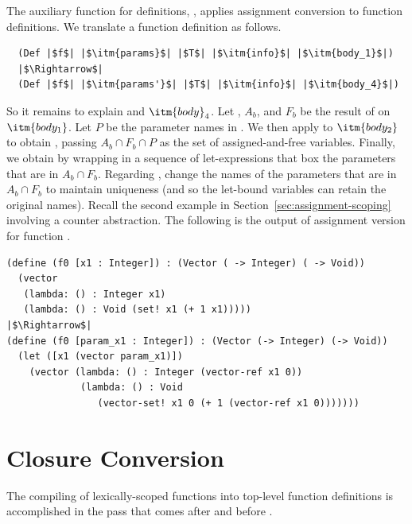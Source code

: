 \documentclass[7x10]{TimesAPriori_MIT}%
\begin{document}
The auxiliary function for definitions, ,
applies assignment conversion to function definitions.
We translate a function definition as follows.
\begin{lstlisting}
  (Def |$f$| |$\itm{params}$| |$T$| |$\itm{info}$| |$\itm{body_1}$|)
  |$\Rightarrow$|
  (Def |$f$| |$\itm{params'}$| |$T$| |$\itm{info}$| |$\itm{body_4}$|)
\end{lstlisting}
So it remains to explain  and $\itm{body}_4$.
Let , $A_b$, and $F_b$ be the result of
 on $\itm{body_1}$.
Let $P$ be the parameter names in .
We then apply  to $\itm{body_2}$ to
obtain , passing $A_b \cap F_b \cap P$
as the set of assigned-and-free variables.
Finally, we obtain  by wrapping 
in a sequence of let-expressions that box the parameters
that are in $A_b \cap F_b$.
%
Regarding , change the names of the parameters that are
in $A_b \cap F_b$ to maintain uniqueness (and so the let-bound
variables can retain the original names). Recall the second example in
Section~\ref{sec:assignment-scoping} involving a counter
abstraction. The following is the output of assignment version for
function .
\begin{lstlisting}
(define (f0 [x1 : Integer]) : (Vector ( -> Integer) ( -> Void))
  (vector
   (lambda: () : Integer x1)
   (lambda: () : Void (set! x1 (+ 1 x1)))))
|$\Rightarrow$|
(define (f0 [param_x1 : Integer]) : (Vector (-> Integer) (-> Void))
  (let ([x1 (vector param_x1)])
    (vector (lambda: () : Integer (vector-ref x1 0))
             (lambda: () : Void
                (vector-set! x1 0 (+ 1 (vector-ref x1 0)))))))
\end{lstlisting}

\section{Closure Conversion}
\label{sec:closure-conversion}

The compiling of lexically-scoped functions into top-level function
definitions is accomplished in the pass 
that comes after  and before
. 
\end{document}
